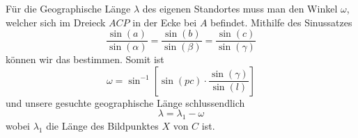 Für die Geographische Länge $\lambda$ des eigenen Standortes muss man den Winkel $\omega$, welcher sich im Dreieck $ACP$ in der Ecke bei $A$ befindet. 
Mithilfe des Sinussatzes \[\frac{\sin (a)}{\sin (\alpha)} =\frac{\sin (b)}{\sin (\beta)} = \frac{\sin (c)}{\sin (\gamma)}\] können wir das bestimmen. 
Somit ist \[ \omega=\sin^{-1}[\sin(pc) \cdot \frac{\sin(\gamma)}{\sin(l)}] \]und unsere gesuchte geographische Länge schlussendlich 
\[\lambda=\lambda_1 - \omega\]
wobei $\lambda_1$ die Länge des Bildpunktes $X$ von $C$ ist.
